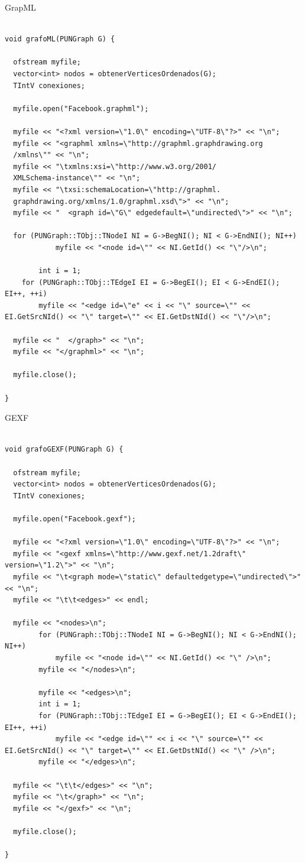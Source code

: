 \documentclass[book, 16 pt, conference]{ieeeconf}
\begin{document}
GrapML

\begin{lstlisting}

void grafoML(PUNGraph G) {

  ofstream myfile;
  vector<int> nodos = obtenerVerticesOrdenados(G);
  TIntV conexiones;

  myfile.open("Facebook.graphml");

  myfile << "<?xml version=\"1.0\" encoding=\"UTF-8\"?>" << "\n";
  myfile << "<graphml xmlns=\"http://graphml.graphdrawing.org
  /xmlns\"" << "\n";
  myfile << "\txmlns:xsi=\"http://www.w3.org/2001/
  XMLSchema-instance\"" << "\n";
  myfile << "\txsi:schemaLocation=\"http://graphml.
  graphdrawing.org/xmlns/1.0/graphml.xsd\">" << "\n";
  myfile << "  <graph id=\"G\" edgedefault=\"undirected\">" << "\n";

  for (PUNGraph::TObj::TNodeI NI = G->BegNI(); NI < G->EndNI(); NI++)
			myfile << "<node id=\"" << NI.GetId() << "\"/>\n";

		int i = 1;
	for (PUNGraph::TObj::TEdgeI EI = G->BegEI(); EI < G->EndEI(); EI++, ++i)
		myfile << "<edge id=\"e" << i << "\" source=\"" << EI.GetSrcNId() << "\" target=\"" << EI.GetDstNId() << "\"/>\n";

  myfile << "  </graph>" << "\n";
  myfile << "</graphml>" << "\n";

  myfile.close();

}

\end{lstlisting}

GEXF

\begin{lstlisting}

void grafoGEXF(PUNGraph G) {

  ofstream myfile;
  vector<int> nodos = obtenerVerticesOrdenados(G);
  TIntV conexiones;

  myfile.open("Facebook.gexf");

  myfile << "<?xml version=\"1.0\" encoding=\"UTF-8\"?>" << "\n";
  myfile << "<gexf xmlns=\"http://www.gexf.net/1.2draft\" version=\"1.2\">" << "\n";
  myfile << "\t<graph mode=\"static\" defaultedgetype=\"undirected\">" << "\n";
  myfile << "\t\t<edges>" << endl;

  myfile << "<nodes>\n";
		for (PUNGraph::TObj::TNodeI NI = G->BegNI(); NI < G->EndNI(); NI++)
			myfile << "<node id=\"" << NI.GetId() << "\" />\n";
		myfile << "</nodes>\n";

		myfile << "<edges>\n";
		int i = 1;
		for (PUNGraph::TObj::TEdgeI EI = G->BegEI(); EI < G->EndEI(); EI++, ++i)
			myfile << "<edge id=\"" << i << "\" source=\"" << EI.GetSrcNId() << "\" target=\"" << EI.GetDstNId() << "\" />\n";
		myfile << "</edges>\n";

  myfile << "\t\t</edges>" << "\n";
  myfile << "\t</graph>" << "\n";
  myfile << "</gexf>" << "\n";

  myfile.close();

}

\end{lstlisting}
\end{document}
